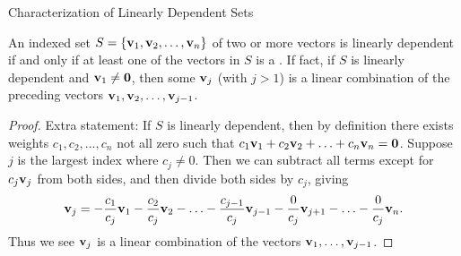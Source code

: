 \documentclass[xcolor=dvipsnames,aspectratio=169,t]{beamer}
\begin{document}
\begin{frame}{Characterization of Linearly Dependent Sets}
  \begin{theorem}
    An indexed set $S = \left\{ \mathbf{v}_1, \mathbf{v}_2, \ldots, \mathbf{v}_n \right\}$ of two or more vectors is \alert{linearly dependent} if and only if at least one of the vectors in $S$ is a . If fact, if $S$ is linearly dependent and $\mathbf{v}_1 \ne \mathbf{0}$, then some $\mathbf{v}_j$ (with $j > 1$) is a linear combination of the preceding vectors $\mathbf{v}_1, \mathbf{v}_2, \ldots, \mathbf{v}_{j-1}$.
  \end{theorem}
  
  \pause
  \begin{proof}
    \alert{Extra statement:} If $S$ is linearly dependent, then by definition there exists weights $c_1, c_2, \ldots, c_n$ not all zero such that $\displaystyle c_1  \mathbf{v}_1 + c_2  \mathbf{v}_2  + \ldots + c_n  \mathbf{v}_n = \mathbf{0}$.
    Suppose $j$ is the largest index where $c_j \ne 0$. 
    \pause
    Then we can subtract all terms except for $c_j \mathbf{v}_j$ from both sides, and then divide both sides by $c_j$, giving
    \[  \mathbf{v}_j = -\frac{c_1}{c_j}  \mathbf{v}_1 -\frac{c_2}{c_j}  \mathbf{v}_2 - \ldots - \frac{c_{j-1}}{c_j}  \mathbf{v}_{j-1} -  \frac{0}{c_j}  \mathbf{v}_{j+1} - \ldots -  \frac{0}{c_j}  \mathbf{v}_{n}.\]
    Thus we see  $\mathbf{v}_j$ is a linear combination of the vectors $\mathbf{v}_1,\ldots,\mathbf{v}_{j-1}$.
  \end{proof}
  
\end{frame}
  
\end{document}
